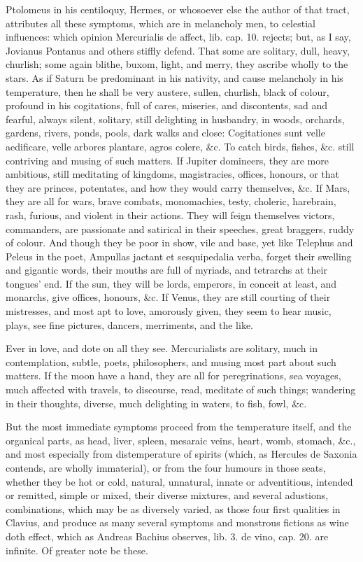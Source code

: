 {Ptolomeus in his centiloquy, Hermes, or whosoever else the author of
that tract, attributes all these symptoms, which are in melancholy men,
to celestial influences: which opinion Mercurialis de affect, lib. cap.
10. rejects; but, as I say, Jovianus Pontanus and others stiffly
defend. That some are solitary, dull, heavy, churlish; some again
blithe, buxom, light, and merry, they ascribe wholly to the stars. As
if Saturn be predominant in his nativity, and cause melancholy in his
temperature, then he shall be very austere, sullen, churlish,
black of colour, profound in his cogitations, full of cares, miseries,
and discontents, sad and fearful, always silent, solitary, still
delighting in husbandry, in woods, orchards, gardens, rivers, ponds,
pools, dark walks and close: Cogitationes sunt velle aedificare, velle
arbores plantare, agros colere, \&c. To catch birds, fishes, \&c. still
contriving and musing of such matters. If Jupiter domineers, they are
more ambitious, still meditating of kingdoms, magistracies, offices,
honours, or that they are princes, potentates, and how they would carry
themselves, \&c. If Mars, they are all for wars, brave combats,
monomachies, testy, choleric, harebrain, rash, furious, and violent in
their actions. They will feign themselves victors, commanders, are
passionate and satirical in their speeches, great braggers, ruddy of
colour. And though they be poor in show, vile and base, yet like
Telephus and Peleus in the poet, Ampullas jactant et
sesquipedalia verba, forget their swelling and gigantic words, their
mouths are full of myriads, and tetrarchs at their tongues' end. If the
sun, they will be lords, emperors, in conceit at least, and monarchs,
give offices, honours, \&c. If Venus, they are still courting of their
mistresses, and most apt to love, amorously given, they seem to hear
music, plays, see fine pictures, dancers, merriments, and the like.

Ever in love, and dote on all they see. Mercurialists are solitary,
much in contemplation, subtle, poets, philosophers, and musing most
part about such matters. If the moon have a hand, they are all for
peregrinations, sea voyages, much affected with travels, to discourse,
read, meditate of such things; wandering in their thoughts, diverse,
much delighting in waters, to fish, fowl, \&c.

But the most immediate symptoms proceed from the temperature itself,
and the organical parts, as head, liver, spleen, mesaraic veins, heart,
womb, stomach, \&c., and most especially from distemperature of spirits
(which, as Hercules de Saxonia contends, are wholly immaterial),
or from the four humours in those seats, whether they be hot or cold,
natural, unnatural, innate or adventitious, intended or remitted,
simple or mixed, their diverse mixtures, and several adustions,
combinations, which may be as diversely varied, as those four
first qualities in  Clavius, and produce as many several symptoms
and monstrous fictions as wine doth effect, which as Andreas Bachius
observes, lib. 3. de vino, cap. 20. are infinite. Of greater note be
these.

}
